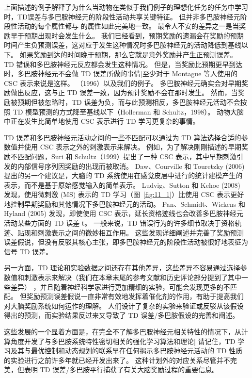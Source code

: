 上面描述的例子解释了为什么当动物在类似于我们例子的理想化任务的任务中学习时，TD误差与多巴胺神经元的阶段性活动共享关键特征。
但并非多巴胺神经元阶段性活动的每个属性都与 的属性如此完美地一致。
最令人不安的差异之一是当奖励早于预期出现时会发生什么。
我们已经看到，预期奖励的遗漏会在奖励的预期时间产生负预测误差，这对应于发生这种情况时多巴胺神经元的活动降低到基线以下。
如果奖励到达的时间晚于预期，那么它就是意外奖励并产生正预测误差。
TD 错误和多巴胺神经元反应都会发生这种情况。
但是，当奖励比预期更早到达时，多巴胺神经元不会做 TD 误差所做的事情|至少对于 Montague 等人使用的 CSC 表示来说是这样。 （1996）以及我们的例子。
多巴胺神经元确实会对早期奖励做出反应，这与正 TD 误差一致，因为预计奖励不会在那时发生。
然而，当奖励被预期但被忽略时，TD 误差为负，而与此预测相反，多巴胺神经元活动不会按照 TD 模型预测的方式降至基线以下（Hollerman 和 Schultz，1998）。
动物大脑中正在发生比简单地使用 CSC 表示进行 TD 学习更复杂的事情。



TD 误差和多巴胺神经元活动之间的一些不匹配可以通过为 TD 算法选择合适的参数值并使用 CSC 表示之外的刺激表示来解决。
例如，为了解决刚刚描述的早期奖励不匹配问题，Suri 和 Schultz（1999）提出了一种 CSC 表示，其中早期刺激引发的内部信号序列因奖励的出现而被取消。
Daw、Courville 和 Touretzky (2006) 提出的另一个建议是，大脑的 TD 系统使用在感觉皮层中进行的统计建模产生的表示，而不是基于原始感觉输入的简单表示。
Ludvig、Sutton 和 Kehoe (2008) 发现，使用微刺激 (MS) 表示的 TD 学习（图~\ref{fig:11_1}）比使用 CSC 表示更好地控制早期奖励和其他情况下多巴胺神经元的活动。
Pan、Schmidt、Wickens 和 Hyland (2005) 发现，即使使用 CSC 表示，延长资格迹线也会改善多巴胺神经元活动某些方面的 TD 误差 t。
一般来说，TD 错误行为的许多细节取决于资格轨迹、贴现和刺激表示之间的微妙相互作用。
这些发现详细阐述并完善了奖励预测误差假说，但没有反驳其核心主张，即多巴胺神经元的阶段性活动被很好地表征为信号 TD 误差。


另一方面，TD 理论和实验数据之间还存在其他差异，这些差异不容易通过选择参数值和刺激表示来解决（我们在本章末尾的参考文献和历史评论部分提到了其中一些差异） ，并且随着神经科学家进行更加精细的实验，可能会发现更多的不匹配。
但奖励预测误差假说一直非常有效地发挥着催化剂的作用，有助于提高我们对大脑奖励系统如何运作的理解。
人们设计了复杂的实验来验证或反驳从该假设得出的预测，而实验结果反过来又导致了 TD 误差/多巴胺假设的完善和阐述。


这些发展的一个显着方面是，在完全不了解多巴胺神经元相关特性的情况下，从计算角度开发了与多巴胺系统特性密切相关的强化学习算法和理论| 请记住，TD 学习及其与最优控制和动态规划的联系早在任何揭示多巴胺神经元活动的 TD 性质的实验进行之前许多年就已经开发出来了。
这种计划外的对应关系尽管并不完美，但表明 TD 误差/多巴胺平行捕获了有关大脑奖励过程的重要信息。


